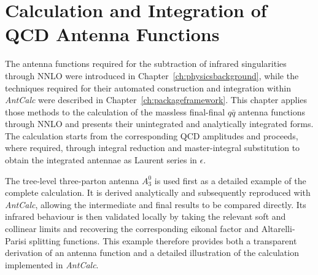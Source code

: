 \chapter{Calculation and Integration of QCD Antenna Functions}\label{ch:workedexample}
\label{sec:masterresults}

The antenna functions required for the subtraction of infrared singularities through NNLO
were introduced in Chapter~\ref{ch:physicsbackground}, while the techniques required for their
automated construction and integration within \textit{AntCalc} were described in
Chapter~\ref{ch:packageframework}. This chapter applies those methods to the calculation of the
massless final-final $q\bar q$ antenna functions through NNLO and presents their unintegrated and
analytically integrated forms. The calculation starts from the corresponding QCD amplitudes and
proceeds, where required, through integral reduction and master-integral substitution to obtain the
integrated antennae as Laurent series in $\epsilon$.

The tree-level three-parton antenna $A_3^0$ is used first as a detailed example of the complete
calculation. It is derived analytically and subsequently reproduced with \textit{AntCalc}, allowing
the intermediate and final results to be compared directly. Its infrared behaviour is then validated
locally by taking the relevant soft and collinear limits and recovering the corresponding eikonal
factor and Altarelli-Parisi splitting functions. This example therefore provides both a transparent
derivation of an antenna function and a detailed illustration of the calculation implemented in
\textit{AntCalc}.

